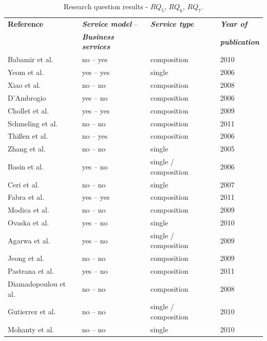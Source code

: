 \documentclass{sig-alternate}
\begin{document}
 
\begin{table}[ht!]
\centering
\tiny
\begin{tabular}{l|l|l|l}
  \hline 
  \hline
   \textbf{Reference} & \textbf{\textit{Service model}} --
   & \textbf{\textit{Service type}}  &
   \textbf{\textit{Year of}} 
   \\
    &   \textbf{\textit{Business services}} &   &
   \textbf{\textit{publication}} 
   \\
  \hline
  \hline  
  Babamir et al. \cite{Babamir2010} & no -- yes  & composition & 2010   
 \\  
  \hline   
  Yeom et al. \cite{Yeom2006} & yes -- yes & single   & 2006  \\  \hline
  Xiao et al. \cite{XiaoCZBOLH08} & no -- no & composition    & 2008
   \\ 
  \hline 
  D'Ambrogio \cite{DAmbrogio06} & yes  -- no & composition  & 2006 \\
   \hline
  Chollet et al. \cite{CholletL09} & yes -- yes & composition  &  2009 \\
  \hline 
  Schmeling et al. \cite{SchmelingCM11} & no -- no & composition &  2011 \\ 
  \hline
   Thi{\ss}en et al. \cite{ThissenW06} & no -- yes & composition & 2006
   \\
  \hline
  Zhang et al. \cite{ZhangPSP05} & no -- no  & single  & 2005 \\ 
  \hline
  Basin et al. \cite{BasinDL06} & yes -- no & single / composition  & 
  2006\\
  \hline 
  Ceri et al. \cite{CeriDMF07} & no -- no  & single  &  2007\\ 
  \hline 
  Fabra et al. \cite{Fabra2011} & yes -- yes & composition  &  2011\\
  \hline
  Modica et al. \cite{ModicaTV09} & no -- no & composition & 2009\\ 
  \hline
  Ovaska et al. \cite{OvaskaEHPA10} & yes -- no & single & 2010\\
  \hline
  Agarwa et al. \cite{AgarwalLS09} & yes -- no & single / composition  &  
  2009\\
  \hline
  Jeong et al. \cite{JeongCL09} & no -- no  & composition &  2009\\
  \hline
  Pastrana et al. \cite{PastranaPK11} & yes -- no & composition &  2011 \\
  \hline
  Diamadopoulou et al. \cite{DiamadopoulouMPS08} & no -- no & composition 
  & 2008\\
  \hline
  Gutierrez et al. \cite{GutierrezRF10} & no -- no &  single / composition 
  & 2010\\
  \hline
  Mohanty et al. \cite{MohantyRP10} & no -- no  & single  & 2010\\
  \hline
  \hline  
\end{tabular}
\caption{Research question results - $RQ_5$, $RQ_6$, $RQ_7$.}
\label{tab:result03}
\end{table} 
\end{document}
